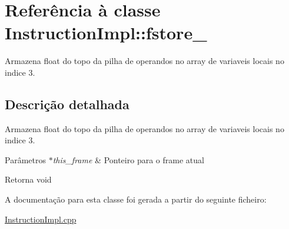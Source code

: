 \hypertarget{class_instruction_impl_1_1fstore__3}{}\section{Referência à classe Instruction\+Impl\+:\+:fstore\+\_}
\label{class_instruction_impl_1_1fstore__3}


Armazena float do topo da pilha de operandos no array de variaveis locais no indice 3.  




\subsection{Descrição detalhada}
Armazena float do topo da pilha de operandos no array de variaveis locais no indice 3. 


\begin{DoxyParams}{Parâmetros}
{\em $\ast$this\+\_\+frame} & Ponteiro para o frame atual \\
\hline
\end{DoxyParams}
\begin{DoxyReturn}{Retorna}
void 
\end{DoxyReturn}


A documentação para esta classe foi gerada a partir do seguinte ficheiro\+:\begin{DoxyCompactItemize}
\item 
\hyperlink{_instruction_impl_8cpp}{Instruction\+Impl.\+cpp}\end{DoxyCompactItemize}
